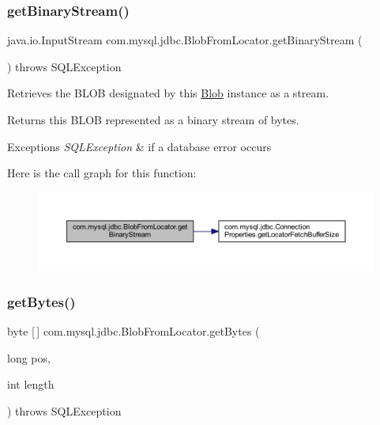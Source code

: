 \subsubsection{\texorpdfstring{get\+Binary\+Stream()}{getBinaryStream()}}
{\footnotesize\ttfamily java.\+io.\+Input\+Stream com.\+mysql.\+jdbc.\+Blob\+From\+Locator.\+get\+Binary\+Stream (\begin{DoxyParamCaption}{ }\end{DoxyParamCaption}) throws S\+Q\+L\+Exception}

Retrieves the B\+L\+OB designated by this \mbox{\hyperlink{classcom_1_1mysql_1_1jdbc_1_1_blob}{Blob}} instance as a stream.

\begin{DoxyReturn}{Returns}
this B\+L\+OB represented as a binary stream of bytes.
\end{DoxyReturn}

\begin{DoxyExceptions}{Exceptions}
{\em S\+Q\+L\+Exception} & if a database error occurs \\
\hline
\end{DoxyExceptions}
Here is the call graph for this function\+:\nopagebreak
\begin{figure}[H]
\begin{center}
\leavevmode
\includegraphics[width=350pt]{classcom_1_1mysql_1_1jdbc_1_1_blob_from_locator_a44883808ac8f47fae08435ac5ddcc6b6_cgraph}
\end{center}
\end{figure}
\mbox{\label{classcom_1_1mysql_1_1jdbc_1_1_blob_from_locator_ab3fbef493872180d7665934bfd5eeaa0}} 
\subsubsection{\texorpdfstring{get\+Bytes()}{getBytes()}}
{\footnotesize\ttfamily byte \mbox{[}$\,$\mbox{]} com.\+mysql.\+jdbc.\+Blob\+From\+Locator.\+get\+Bytes (\begin{DoxyParamCaption}\item[{long}]{pos,  }\item[{int}]{length }\end{DoxyParamCaption}) throws S\+Q\+L\+Exception}

